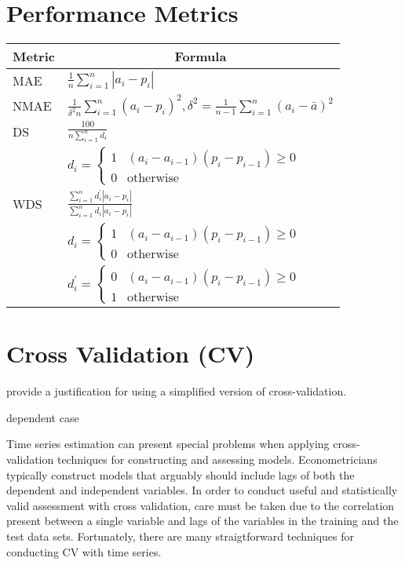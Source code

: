 \documentclass[12pt]{article}
\begin{document}
\section{Performance Metrics}

\cite{e.h01:_applic}

{\large
\begin{tabular}{|l|l|}
  \hline
\multicolumn{1}{|c|}{Metric}&\multicolumn{1}{|c|}{Formula}\\
  \hline
MAE&$\frac{1}{n}\sum_{i=1}^n | a_i-p_i|$\\
  \hline
NMAE&$\frac{1}{\delta^2n}\sum_{i=1}^n (a_i-p_i)^2, \delta^2=\frac{1}{n-1}\sum_{i=1}^n(a_i-\bar{a})^2$\\
  \hline
DS&{\Large $\frac{100}{n \sum_{i=1}^n d_i}$}\\
& $d_i=
    \begin{cases}
      1&(a_i-a_{i-1})(p_i-p_{i-1}) \ge 0\\
      0&\text{otherwise}
    \end{cases}$\\
  \hline
WDS&{\Large $\frac{\sum_{i=1}^n d^\prime_i|a_i-p_i|}{\sum_{i=1}^n d_i|a_i-p_i|}$}\\
&$ d_i=
    \begin{cases}
      1&(a_i-a_{i-1})(p_i-p_{i-1}) \ge 0\\
      0&\text{otherwise}
    \end{cases}$\\
&$ d_i^\prime=
    \begin{cases}
      0&(a_i-a_{i-1})(p_i-p_{i-1}) \ge 0\\
      1&\text{otherwise}
    \end{cases}$\\
  \hline
\end{tabular}
}

\section{Cross Validation (CV)}

\cite{bergmeir15:_note} provide a justification for using a simplified version of cross-validation.


\cite{conf/icann/LendasseWV03}  \cite{kreiss12}

dependent case \cite{racine00:_consis}


Time series estimation can present special problems 
when applying cross-validation techniques for  constructing and
assessing models. 
Econometricians typically construct 
models that arguably should include
lags of both the dependent and independent variables.
In order to conduct  useful and statistically valid assessment
with cross validation, 
care must be taken due to the correlation present between a 
single variable and lags of the variables in the training and the test
data sets.
Fortunately,  there are many straigtforward techniques for conducting CV 
with time series.
\end{document}

